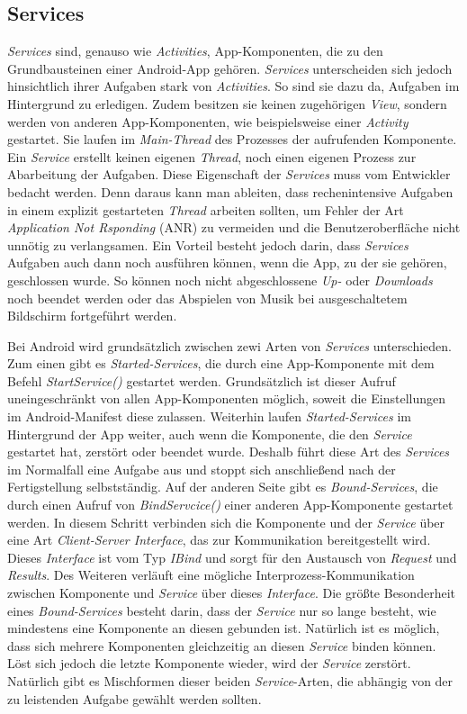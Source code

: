 \subsection{Services}
\label{ssec:android-services}
\textit{Services} sind, genauso wie \textit{Activities}, App-Komponenten, die zu den Grundbausteinen einer Android-App gehören. \textit{Services} unterscheiden sich jedoch hinsichtlich ihrer Aufgaben stark von \textit{Activities}. So sind sie dazu da, Aufgaben im Hintergrund zu erledigen. Zudem besitzen sie keinen zugehörigen \textit{View}, sondern werden von anderen App-Komponenten, wie beispielsweise einer \textit{Activity} gestartet. Sie laufen im \textit{Main-Thread} des Prozesses der aufrufenden Komponente. Ein \textit{Service} erstellt keinen eigenen \textit{Thread}, noch einen eigenen Prozess zur Abarbeitung der Aufgaben. Diese Eigenschaft der \textit{Services} muss vom Entwickler bedacht werden. Denn daraus kann man ableiten, dass rechenintensive Aufgaben in einem explizit gestarteten \textit{Thread} arbeiten sollten, um Fehler der Art \textit{Application Not Rsponding} (ANR) zu vermeiden und die Benutzeroberfläche nicht unnötig zu verlangsamen. Ein Vorteil besteht jedoch darin, dass \textit{Services} Aufgaben auch dann noch ausführen können, wenn die App, zu der sie gehören, geschlossen wurde. So können noch nicht abgeschlossene \textit{Up-} oder \textit{Downloads} noch beendet werden oder das Abspielen von Musik bei ausgeschaltetem Bildschirm fortgeführt werden.

Bei Android wird grundsätzlich zwischen zewi Arten von \textit{Services} unterschieden. Zum einen gibt es \textit{Started-Services}, die durch eine App-Komponente mit dem Befehl \textit{StartService()} gestartet werden. Grundsätzlich ist dieser Aufruf uneingeschränkt von allen App-Komponenten möglich, soweit die Einstellungen im Android-Manifest diese zulassen. Weiterhin laufen \textit{Started-Services} im Hintergrund der App weiter, auch wenn die Komponente, die den \textit{Service} gestartet hat, zerstört oder beendet wurde. Deshalb führt diese Art des \textit{Services} im Normalfall eine Aufgabe aus und stoppt sich anschließend nach der Fertigstellung selbstständig. Auf der anderen Seite gibt es \textit{Bound-Services}, die durch einen Aufruf von \textit{BindServcice()} einer anderen App-Komponente gestartet werden. In diesem Schritt verbinden sich die Komponente und der \textit{Service} über eine Art \textit{Client-Server Interface}, das zur Kommunikation bereitgestellt wird. Dieses \textit{Interface} ist vom Typ \textit{IBind} und sorgt für den Austausch von \textit{Request} und \textit{Results}. Des Weiteren verläuft eine mögliche Interprozess-Kommunikation zwischen Komponente und \textit{Service} über dieses \textit{Interface}. Die größte Besonderheit eines \textit{Bound-Services} besteht darin, dass der \textit{Service} nur so lange besteht, wie mindestens eine Komponente an diesen gebunden ist. Natürlich ist es möglich, dass sich mehrere Komponenten gleichzeitig an diesen \textit{Service} binden können. Löst sich jedoch die letzte Komponente wieder, wird der \textit{Service} zerstört. Natürlich gibt es Mischformen dieser beiden \textit{Service}-Arten, die abhängig von der zu leistenden Aufgabe gewählt werden sollten. 

